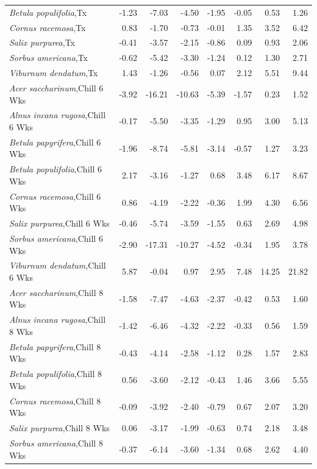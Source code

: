 \documentclass{article}\usepackage[]{graphicx}\usepackage[]{color}
\begin{document}
\begin{longtable}{lrrrrrrr}
  \textit{Betula populifolia},Tx & -1.23 & -7.03 & -4.50 & -1.95 & -0.05 & 0.53 & 1.26 \\ 
  \textit{Cornus racemosa},Tx & 0.83 & -1.70 & -0.73 & -0.01 & 1.35 & 3.52 & 6.42 \\ 
  \textit{Salix purpurea},Tx & -0.41 & -3.57 & -2.15 & -0.86 & 0.09 & 0.93 & 2.06 \\ 
  \textit{Sorbus americana},Tx & -0.62 & -5.42 & -3.30 & -1.24 & 0.12 & 1.30 & 2.71 \\ 
  \textit{Viburnum dendatum},Tx & 1.43 & -1.26 & -0.56 & 0.07 & 2.12 & 5.51 & 9.44 \\ 
  \textit{Acer saccharinum},Chill 6 Wks & -3.92 & -16.21 & -10.63 & -5.39 & -1.57 & 0.23 & 1.52 \\ 
  \textit{Alnus incana rugosa},Chill 6 Wks & -0.17 & -5.50 & -3.35 & -1.29 & 0.95 & 3.00 & 5.13 \\ 
  \textit{Betula papyrifera},Chill 6 Wks & -1.96 & -8.74 & -5.81 & -3.14 & -0.57 & 1.27 & 3.23 \\ 
  \textit{Betula populifolia},Chill 6 Wks & 2.17 & -3.16 & -1.27 & 0.68 & 3.48 & 6.17 & 8.67 \\ 
  \textit{Cornus racemosa},Chill 6 Wks & 0.86 & -4.19 & -2.22 & -0.36 & 1.99 & 4.30 & 6.56 \\ 
  \textit{Salix purpurea},Chill 6 Wks & -0.46 & -5.74 & -3.59 & -1.55 & 0.63 & 2.69 & 4.98 \\ 
  \textit{Sorbus americana},Chill 6 Wks & -2.90 & -17.31 & -10.27 & -4.52 & -0.34 & 1.95 & 3.78 \\ 
  \textit{Viburnum dendatum},Chill 6 Wks & 5.87 & -0.04 & 0.97 & 2.95 & 7.48 & 14.25 & 21.82 \\ 
  \textit{Acer saccharinum},Chill 8 Wks & -1.58 & -7.47 & -4.63 & -2.37 & -0.42 & 0.53 & 1.60 \\ 
  \textit{Alnus incana rugosa},Chill 8 Wks & -1.42 & -6.46 & -4.32 & -2.22 & -0.33 & 0.56 & 1.59 \\ 
  \textit{Betula papyrifera},Chill 8 Wks & -0.43 & -4.14 & -2.58 & -1.12 & 0.28 & 1.57 & 2.83 \\ 
  \textit{Betula populifolia},Chill 8 Wks & 0.56 & -3.60 & -2.12 & -0.43 & 1.46 & 3.66 & 5.55 \\ 
  \textit{Cornus racemosa},Chill 8 Wks & -0.09 & -3.92 & -2.40 & -0.79 & 0.67 & 2.07 & 3.20 \\ 
  \textit{Salix purpurea},Chill 8 Wks & 0.06 & -3.17 & -1.99 & -0.63 & 0.74 & 2.18 & 3.48 \\ 
  \textit{Sorbus americana},Chill 8 Wks & -0.37 & -6.14 & -3.60 & -1.34 & 0.68 & 2.62 & 4.40 \\ 

\end{longtable}
\end{document}

